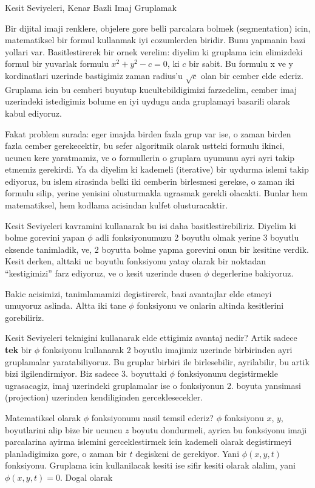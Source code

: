 \documentclass[12pt,fleqn]{article}
\begin{document}
Kesit Seviyeleri, Kenar Bazli Imaj Gruplamak

Bir dijital imaji renklere, objelere gore belli parcalara bolmek
(segmentation) icin, matematiksel bir formul kullanmak iyi cozumlerden
biridir. Bunu yapmanin bazi yollari var. Basitlestirerek bir ornek
verelim: diyelim ki gruplama icin elimizdeki formul bir yuvarlak
formulu $x^2+y^2 - c = 0$, ki $c$ bir sabit. Bu formulu x ve y
kordinatlari uzerinde bastigimiz zaman radius'u $\sqrt{c}$ olan bir
cember elde ederiz. Gruplama icin bu cemberi buyutup
kucultebildigimizi farzedelim, cember imaj uzerindeki istedigimiz
bolume en iyi uydugu anda gruplamayi basarili olarak kabul ediyoruz.

Fakat problem surada: eger imajda birden fazla grup var ise, o zaman
birden fazla cember gerekecektir, bu sefer algoritmik olarak ustteki
formulu ikinci, ucuncu kere yaratmamiz, ve o formullerin o gruplara
uyumunu ayri ayri takip etmemiz gerekirdi. Ya da diyelim ki kademeli
(iterative) bir uydurma islemi takip ediyoruz, bu islem sirasinda
belki iki cemberin birlesmesi gerekse, o zaman iki formulu silip,
yerine yenisini olusturmakla ugrasmak gerekli olacakti. Bunlar hem
matematiksel, hem kodlama acisindan kulfet olusturacaktir.

Kesit Seviyeleri kavramini kullanarak bu isi daha
basitlestirebiliriz. Diyelim ki bolme gorevini yapan $\phi$ adli
fonksiyonumuzu 2 boyutlu olmak yerine 3 boyutlu eksende tanimladik,
ve, 2 boyutta bolme yapma gorevini onun bir kesitine verdik. Kesit
derken, alttaki uc boyutlu fonksiyonu yatay olarak bir noktadan
``kestigimizi'' farz ediyoruz, ve o kesit uzerinde dusen $\phi$
degerlerine bakiyoruz.

Bakic acisimizi, tanimlamamizi degistirerek, bazi avantajlar elde
etmeyi umuyoruz aslinda. Altta iki tane $\phi$ fonksiyonu ve onlarin
altinda kesitlerini gorebiliriz.


Kesit Seviyeleri teknigini kullanarak elde ettigimiz avantaj nedir?
Artik sadece \textbf{tek} bir $\phi$ fonksiyonu kullanarak 2 boyutlu
imajimiz uzerinde birbirinden ayri gruplamalar yaratabiliyoruz. Bu
gruplar birbiri ile birlesebilir, ayrilabilir, bu artik bizi
ilgilendirmiyor. Biz sadece 3. boyuttaki $\phi$ fonksiyonunu
degistirmekle ugrasacagiz, imaj uzerindeki gruplamalar ise o
fonksiyonun 2. boyuta yansimasi (projection) uzerinden kendiliginden
gerceklesecekler.

Matematiksel olarak $\phi$ fonksiyonunu nasil temsil ederiz? $\phi$
fonksiyonu $x$, $y$, boyutlarini alip bize bir ucuncu $z$ boyutu
dondurmeli, ayrica bu fonksiyonu imaji parcalarina ayirma islemini
gerceklestirmek icin kademeli olarak degistirmeyi planladigimiza gore,
o zaman bir $t$ degiskeni de gerekiyor. Yani $\phi(x,y,t)$
fonksiyonu. Gruplama icin kullanilacak kesiti ise sifir kesiti olarak
alalim, yani $\phi(x,y,t) = 0$. Dogal olarak
\end{document}
